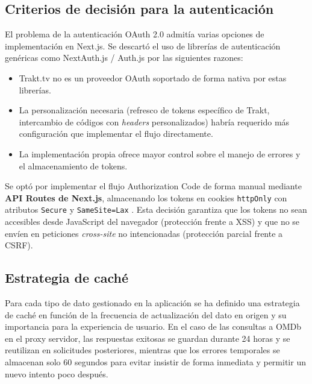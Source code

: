\subsection{Criterios de decisión para la autenticación}

El problema de la autenticación OAuth 2.0 admitía varias opciones de implementación en Next.js. Se descartó el uso de librerías de autenticación genéricas como NextAuth.js / Auth.js por las siguientes razones:

\begin{itemize}
\item Trakt.tv no es un proveedor OAuth soportado de forma nativa por estas librerías.
\item La personalización necesaria (refresco de tokens específico de Trakt, intercambio de códigos con \textit{headers} personalizados) habría requerido más configuración que implementar el flujo directamente.
\item La implementación propia ofrece mayor control sobre el manejo de errores y el almacenamiento de tokens.
\end{itemize}

Se optó por implementar el flujo Authorization Code de forma manual mediante \textbf{API Routes de Next.js}, almacenando los tokens en cookies \texttt{httpOnly} con atributos \texttt{Secure} y \texttt{SameSite=Lax} \parencite{NextJS:2024,OWASP:2021}. Esta decisión garantiza que los tokens no sean accesibles desde JavaScript del navegador (protección frente a XSS) y que no se envíen en peticiones \textit{cross-site} no intencionadas (protección parcial frente a CSRF).

\subsection{Estrategia de caché}

Para cada tipo de dato gestionado en la aplicación se ha definido una estrategia de caché en función de la frecuencia de actualización del dato en origen y su importancia para la experiencia de usuario. En el caso de las consultas a OMDb en el proxy servidor, las respuestas exitosas se guardan durante 24 horas y se reutilizan en solicitudes posteriores, mientras que los errores temporales se almacenan solo 60 segundos para evitar insistir de forma inmediata y permitir un nuevo intento poco después.


